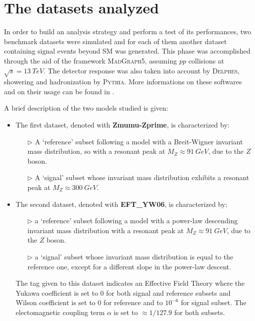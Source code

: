 \section{The datasets analyzed}
In order to build an analysis strategy and perform a test of its performances, two benchmark datasets were simulated and for each of them another dataset containing signal events beyond SM was generated. This phase was accomplished through the aid of the framework \textsc{MadGraph5}, assuming $pp$ collisions at $\sqrt{s} = 13~\si{TeV}$. The detector response was also taken into account by \textsc{Delphes}, showering and hadronization by \textsc{Pythia}. More informations on these softwares and on their usage can be found in \cite{madgraph}.

A brief description of the two models studied is given:
\begin{itemize}
	\item The first dataset, denoted with \textbf{Zmumu-Zprime}, is characterized by:
	\begin{itemize}
		\item[$\triangleright$] A `reference' subset following a model with a Breit-Wigner invariant mass distribution, so with a resonant peak at $M_{Z} \approx 91~\si{GeV}$, due to the $Z$ boson.
		\item[$\triangleright$] A `signal' subset whose invariant mass distribution exhibits a resonant peak at $M_{Z} \approx 300~\si{GeV}$.
	\end{itemize}
	
	\item The second dataset, denoted with \textbf{EFT\_YW06}, is characterized by:
	\begin{itemize}
		\item[$\triangleright$] a `reference' subset following a model with a power-law descending invariant mass distribution with a resonant peak at $M_{Z} \approx 91~\si{GeV}$, due to the $Z$ boson.
		\item[$\triangleright$] a `signal' subset whose invariant mass distribution is equal to the reference one, except for a different slope in the power-law descent.
	\end{itemize}
	The tag given to this dataset indicates an Effective Field Theory where the Yukawa coefficient is set to 0 for both signal and reference subsets and Wilson coefficient is set to 0 for reference and to $10^{-6}$ for signal subset. The electomagnetic coupling term $\alpha$ is set to $\approx 1/127.9$ for both subsets.
\end{itemize}


